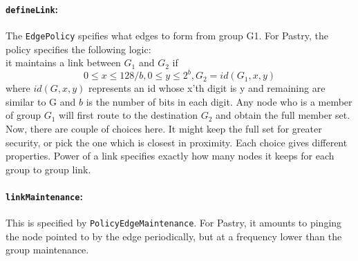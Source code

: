 \paragraph{\texttt{defineLink}:} The \texttt{EdgePolicy} spcifies what edges to form from group G1. For Pastry, the policy specifies the following logic:\\
it maintains a link between $G_1$ and $G_2$ if
\begin{equation}
0 \le x \le 128/b, 0 \le y \le 2^b, G_2 = id(G_1, x, y)
\end{equation}
where $id(G,x,y)$ represents an id whose x'th digit is y and remaining are similar to G and $b$ is the number of bits in each digit. Any node who is a member of group $G_1$ will first route to the destination $G_2$ and obtain the full member set. Now, there are couple of choices here. It might keep the full set for greater security, or pick the one which is closest in proximity. Each choice gives different properties. Power of a link specifies exactly how many nodes it keeps for each group to group link.

\paragraph{\texttt{linkMaintenance}:} This is specified by \texttt{PolicyEdgeMaintenance}. For Pastry, it amounts to pinging the node pointed to by the edge periodically, but at a frequency lower than the group maintenance.


